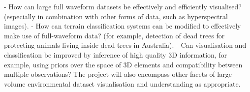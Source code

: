 \documentclass{subfiles}
\begin{document}
- How can large full waveform datasets be effectively and efficiently visualised? (especially in combination with other forms of data, such as hyperspectral images).
- How can terrain classification systems can be modified to effectively make use of full-waveform data? (for example, detection of dead trees for protecting animals living inside dead trees in Australia).  
- Can visualisation and classification be improved by inference of high quality 3D information, for example, using priors over the space of 3D elements and compatibility between multiple observations?
The project will also encompass other facets of large volume environmental dataset visualisation and understanding as appropriate.
\end{document}
